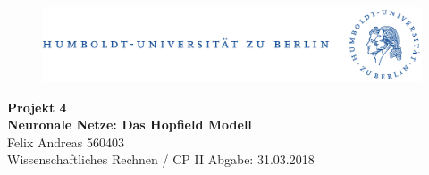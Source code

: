 \documentclass{article}
\begin{document}
\begin{center} \sffamily 
\begin{figure}[h!]\includegraphics[width = \linewidth]{images/hukombi_bbw_op}\end{figure}
\vfill
{\Large \textbf{Projekt 4}}\\
\vspace*{0.2cm}
{\LARGE \textbf{Neuronale Netze: Das Hopfield Modell}}\\
\vspace*{0.35cm}
{\large Felix Andreas 560403}\\
\vspace*{0.25cm}
{\large Wissenschaftliches Rechnen / CP II}
\vfill
\vfill
{\large Abgabe: 31.03.2018}

\thispagestyle{empty}
\clearpage
\end{center}

{\sffamily \tableofcontents}
\thispagestyle{empty}
\clearpage

\setcounter{page}{1}










\newpage
\renewcommand*{\newunitpunct}{\addcomma\space} %
\printbibliography[heading=bibintoc]
\end{document}
